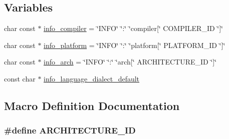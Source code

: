 \subsection*{Variables}
\begin{DoxyCompactItemize}
\item 
char const $\ast$ \hyperlink{a00015_a4b0efeb7a5d59313986b3a0390f050f6_a4b0efeb7a5d59313986b3a0390f050f6}{info\+\_\+compiler} = \char`\"{}I\+N\+FO\char`\"{} \char`\"{}\+:\char`\"{} \char`\"{}compiler\mbox{[}\char`\"{} C\+O\+M\+P\+I\+L\+E\+R\+\_\+\+ID \char`\"{}\mbox{]}\char`\"{}
\item 
char const $\ast$ \hyperlink{a00015_a2321403dee54ee23f0c2fa849c60f7d4_a2321403dee54ee23f0c2fa849c60f7d4}{info\+\_\+platform} = \char`\"{}I\+N\+FO\char`\"{} \char`\"{}\+:\char`\"{} \char`\"{}platform\mbox{[}\char`\"{} P\+L\+A\+T\+F\+O\+R\+M\+\_\+\+ID \char`\"{}\mbox{]}\char`\"{}
\item 
char const $\ast$ \hyperlink{a00015_a59647e99d304ed33b15cb284c27ed391_a59647e99d304ed33b15cb284c27ed391}{info\+\_\+arch} = \char`\"{}I\+N\+FO\char`\"{} \char`\"{}\+:\char`\"{} \char`\"{}arch\mbox{[}\char`\"{} A\+R\+C\+H\+I\+T\+E\+C\+T\+U\+R\+E\+\_\+\+ID \char`\"{}\mbox{]}\char`\"{}
\item 
const char $\ast$ \hyperlink{a00015_a1ce162bad2fe6966ac8b33cc19e120b8_a1ce162bad2fe6966ac8b33cc19e120b8}{info\+\_\+language\+\_\+dialect\+\_\+default}
\end{DoxyCompactItemize}


\subsection{Macro Definition Documentation}
\subsubsection[{\texorpdfstring{A\+R\+C\+H\+I\+T\+E\+C\+T\+U\+R\+E\+\_\+\+ID}{ARCHITECTURE_ID}}]{\setlength{\rightskip}{0pt plus 5cm}\#define A\+R\+C\+H\+I\+T\+E\+C\+T\+U\+R\+E\+\_\+\+ID}\hypertarget{a00015_aba35d0d200deaeb06aee95ca297acb28_aba35d0d200deaeb06aee95ca297acb28}{}\label{a00015_aba35d0d200deaeb06aee95ca297acb28_aba35d0d200deaeb06aee95ca297acb28}
